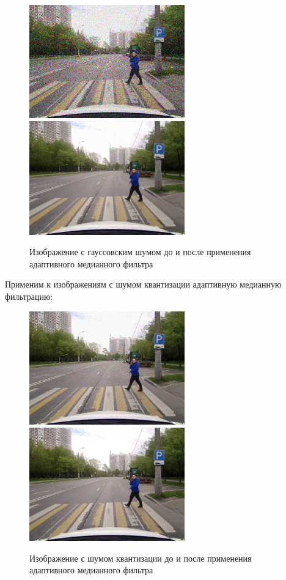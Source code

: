 \begin{figure}[hbt!]
    \centering
    \includegraphics[width=0.6\textwidth]{../outputs/image_gauss_noise.png}
    \includegraphics[width=0.6\textwidth]{../addition/image_gauss_quant_filter_k3.png}
    \caption{Изображение с гауссовским шумом до и после применения адаптивного медианного фильтра}
    \label{fig:stich_images}
\end{figure}

\pagebreak
Применим к изображениям с шумом квантизации адаптивную медианную фильтрацию:

\begin{figure}[ht]
    \centering
    \includegraphics[width=0.6\textwidth]{../outputs/image_quant_noise.png}
    \includegraphics[width=0.6\textwidth]{../source/image.png}
    \caption{Изображение с шумом квантизации до и после применения адаптивного медианного фильтра}
    \label{fig:stich_images}
\end{figure}

